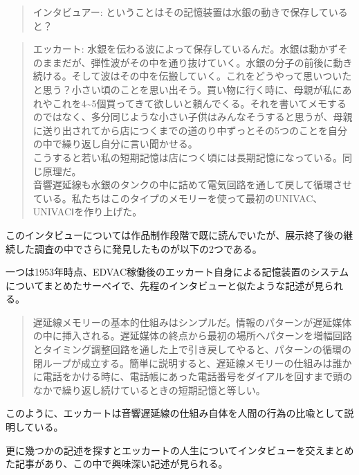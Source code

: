\documentclass[a4paper,report]{jsbook}
\begin{document}
\begin{quote}
インタビュアー: ということはその記憶装置は水銀の動きで保存していると？
\end{quote}

\begin{quote}
エッカート:
水銀を伝わる波によって保存しているんだ。水銀は動かずそのままだが、弾性波がその中を通り抜けていく。水銀の分子の前後に動き続ける。そして波はその中を伝搬していく。これをどうやって思いついたと思う？小さい頃のことを思い出そう。買い物に行く時に、母親が私にあれやこれを4\textasciitilde{}5個買ってきて欲しいと頼んでくる。それを書いてメモするのではなく、多分同じような小さい子供はみんなそうすると思うが、母親に送り出されてから店につくまでの道のり中ずっとその5つのことを自分の中で繰り返し自分に言い聞かせる。\\
こうすると若い私の短期記憶は店につく頃には長期記憶になっている。同じ原理だ。\\
音響遅延線も水銀のタンクの中に詰めて電気回路を通して戻して循環させている。私たちはこのタイプのメモリーを使って最初のUNIVAC、UNIVACⅠを作り上げた。
\end{quote}

\autocite{eckertinterview}

このインタビューについては作品制作段階で既に読んでいたが、展示終了後の継続した調査の中でさらに発見したものが以下の2つである。

一つは1953年時点、EDVAC稼働後のエッカート自身による記憶装置のシステムについてまとめたサーベイで、先程のインタビューと似たような記述が見られる。

\begin{quote}
遅延線メモリーの基本的仕組みはシンプルだ。情報のパターンが遅延媒体の中に挿入される。遅延媒体の終点から最初の場所へパターンを増幅回路とタイミング調整回路を通した上で引き戻してやると、パターンの循環の閉ループが成立する。簡単に説明すると、遅延線メモリーの仕組みは誰かに電話をかける時に、電話帳にあった電話番号をダイアルを回すまで頭のなかで繰り返し続けているときの短期記憶と等しい。
\end{quote}

\autocite{eckert1953survey}このように、エッカートは音響遅延線の仕組み自体を人間の行為の比喩として説明している。

更に幾つかの記述を探すとエッカートの人生についてインタビューを交えまとめた記事\autocite{eckstein1996j}があり、この中で興味深い記述が見られる。
\end{document}
